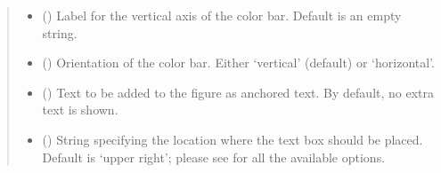 \documentclass[letterpaper,10pt,english]{sphinxmanual}
\begin{document}
\begin{fulllineitems}
\begin{quote}
\begin{description}
\begin{itemize}
\item {} 
 () \textendash{} Label for the vertical axis of the color bar. Default is an empty string.

\item {} 
 () \textendash{} Orientation of the color bar. Either ‘vertical’ (default) or ‘horizontal’.

\item {} 
 () \textendash{} Text to be added to the figure as anchored text. By default, no extra text is shown.

\item {} 
 () \textendash{} String specifying the location where the text box should be placed. Default is ‘upper right’;
please see  for all the available options.

\end{itemize}

\end{description}\end{quote}

\end{fulllineitems}

\end{document}
